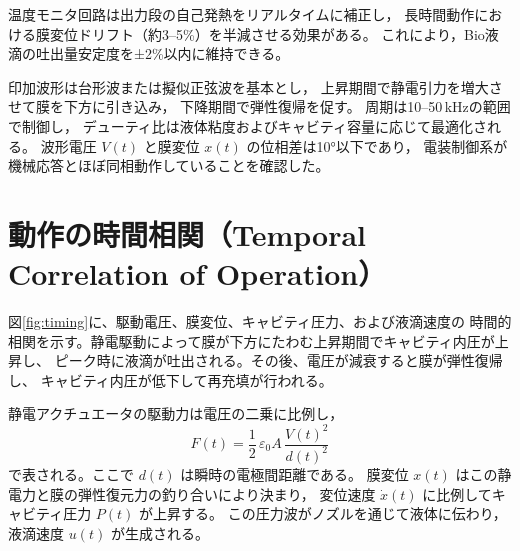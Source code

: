 \documentclass[conference]{IEEEtran}
\begin{document}
温度モニタ回路は出力段の自己発熱をリアルタイムに補正し，
長時間動作における膜変位ドリフト（約3–5\%）を半減させる効果がある。
これにより，Bio液滴の吐出量安定度を±2\%以内に維持できる。

印加波形は台形波または擬似正弦波を基本とし，
上昇期間で静電引力を増大させて膜を下方に引き込み，
下降期間で弾性復帰を促す。
周期は10--50\,kHzの範囲で制御し，
デューティ比は液体粘度およびキャビティ容量に応じて最適化される。
波形電圧 $V(t)$ と膜変位 $x(t)$ の位相差は10°以下であり，
電装制御系が機械応答とほぼ同相動作していることを確認した。

\section{動作の時間相関（Temporal Correlation of Operation）}
図\ref{fig:timing}に、駆動電圧、膜変位、キャビティ圧力、および液滴速度の
時間的相関を示す。静電駆動によって膜が下方にたわむ上昇期間でキャビティ内圧が上昇し、
ピーク時に液滴が吐出される。その後、電圧が減衰すると膜が弾性復帰し、
キャビティ内圧が低下して再充填が行われる。

静電アクチュエータの駆動力は電圧の二乗に比例し，
\[
F(t) = \frac{1}{2}\,\varepsilon_0 A\,\frac{V(t)^2}{d(t)^2}
\]
で表される。ここで $d(t)$ は瞬時の電極間距離である。
膜変位 $x(t)$ はこの静電力と膜の弾性復元力の釣り合いにより決まり，
変位速度 $\dot{x}(t)$ に比例してキャビティ圧力 $P(t)$ が上昇する。
この圧力波がノズルを通じて液体に伝わり，
液滴速度 $u(t)$ が生成される。
\end{document}
